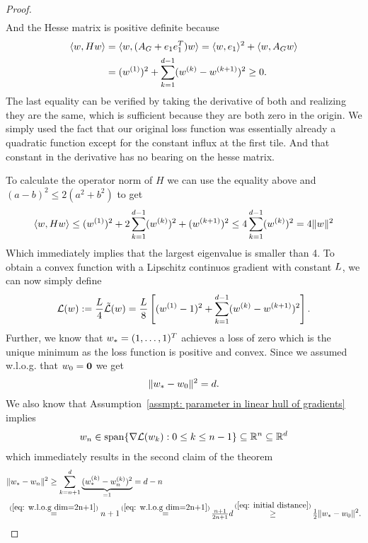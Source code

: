 \begin{proof}
\begin{align*}
	\end{align*}
	And the Hesse matrix is positive definite because
	\begin{align*}
		\langle w , H w\rangle
		&= \langle w, (A_G + e_1 e_1^T) w \rangle
		= \langle w, e_1\rangle^2
		+ \langle w, A_G w\rangle
		\\
		&= (w^{(1)})^2
		+ \sum_{k=1}^{d-1}(w^{(k)}-w^{(k+1)})^2
		\ge 0.
	\end{align*}
	The last equality can be verified by taking the derivative of both and
	realizing they are the same, which is sufficient because they are both zero	
	in the origin. We simply used the fact that our original loss function
	was essentially already a quadratic function except for the constant influx
	at the first tile. And that constant in the derivative has no bearing on the
	hesse matrix.


	To calculate the operator norm of \(H\) we can use the equality above and	
	\((a-b)^2 \le 2(a^2 + b^2)\) to get
	\begin{align*}
		\langle w, Hw\rangle
		\le (w^{(1)})^2 + 2\sum_{k=1}^{d-1}(w^{(k)})^2 + (w^{(k+1)})^2 
		\le 4 \sum_{k=1}^{d-1} (w^{(k)})^2
		= 4 \|w\|^2
	\end{align*}
	Which immediately implies that the largest eigenvalue is smaller than 4. To
	obtain a convex function with a Lipschitz continuos gradient with constant
	\(L\), we can now simply define
	\begin{align*}
		\mathcal{L}(w):= \frac{L}{4}\tilde{\mathcal{L}}(w)
		= \frac{L}{8}\left[
			(w^{(1)}-1)^2
			+ \sum_{k=1}^{d-1} (w^{(k)}-w^{(k+1)})^2
		\right].
	\end{align*}
	Further, we know that \(w_* = (1,\dots,1)^T\) achieves a loss of zero which is
	the unique minimum as the loss function is positive and convex. Since we
	assumed w.l.o.g. that \(w_0=\mathbf{0}\) we get
	\begin{align}\label{eq: initial distance}
		\|w_* - w_0\|^2 = d.
	\end{align}
	We also know
	that Assumption~\ref{assmpt: parameter in linear hull of gradients} implies
	\begin{align*}
		w_n \in \text{span}\{\nabla\mathcal{L}(w_k): 0 \le k \le n-1\}
		\subseteq \mathbb{R}^n \subseteq \mathbb{R}^d
	\end{align*}
	which immediately results in the second claim of the theorem
	\begin{align*}
		\|\minimum - \weights_n\|^2
		&\ge \sum_{k=n+1}^d \underbrace{(\minimum^{(k)}- \weights_n^{(k)})^2}_{=1}
		= d-n \\
		&\lxeq{(\ref{eq: w.l.o.g dim=2n+1})} n+1
		\xeq{(\ref{eq: w.l.o.g dim=2n+1})} \tfrac{n+1}{2n+1} d
		\xge{(\ref{eq: initial distance})} \tfrac12 \|\minimum - \weights_0\|^2. 
	\end{align*}


\end{proof}
